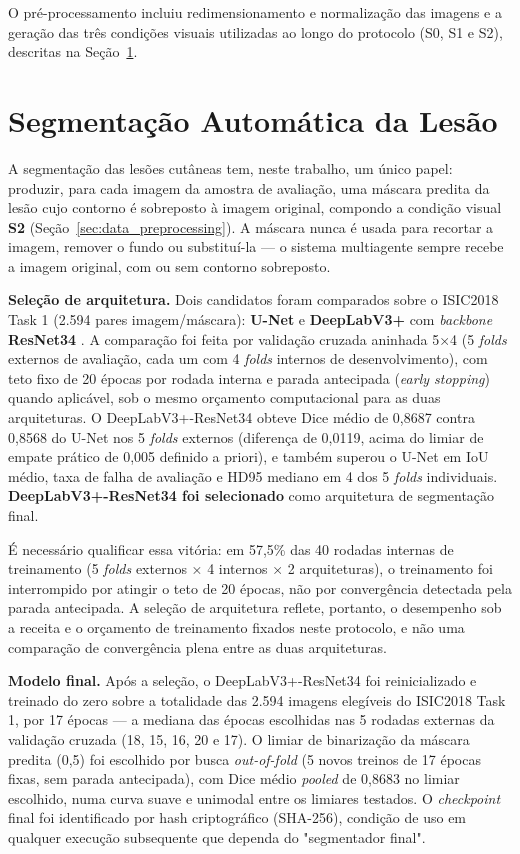 O pré-processamento incluiu redimensionamento e normalização das imagens e a geração das três condições visuais utilizadas ao longo do protocolo (S0, S1 e S2), descritas na Seção~\ref{sec:segmentacao}.


\section{Segmentação Automática da Lesão}
\label{sec:segmentacao}

A segmentação das lesões cutâneas tem, neste trabalho, um único papel: produzir, para cada imagem da amostra de avaliação, uma máscara predita da lesão cujo contorno é sobreposto à imagem original, compondo a condição visual \textbf{S2} (Seção~\ref{sec:data_preprocessing}). A máscara nunca é usada para recortar a imagem, remover o fundo ou substituí-la — o sistema multiagente sempre recebe a imagem original, com ou sem contorno sobreposto.

\textbf{Seleção de arquitetura.} Dois candidatos foram comparados sobre o ISIC2018 Task 1 \cite{codella2018isic} (2.594 pares imagem/máscara): \textbf{U-Net} \cite{ronneberger2015unet} e \textbf{DeepLabV3+} com \textit{backbone} \textbf{ResNet34} \cite{chen2018deeplabv3plus,he2016resnet}. A comparação foi feita por validação cruzada aninhada 5×4 (5 \textit{folds} externos de avaliação, cada um com 4 \textit{folds} internos de desenvolvimento), com teto fixo de 20 épocas por rodada interna e parada antecipada (\textit{early stopping}) quando aplicável, sob o mesmo orçamento computacional para as duas arquiteturas. O DeepLabV3+-ResNet34 obteve Dice médio de 0,8687 contra 0,8568 do U-Net nos 5 \textit{folds} externos (diferença de 0,0119, acima do limiar de empate prático de 0,005 definido a priori), e também superou o U-Net em IoU médio, taxa de falha de avaliação e HD95 mediano em 4 dos 5 \textit{folds} individuais. \textbf{DeepLabV3+-ResNet34 foi selecionado} como arquitetura de segmentação final.

É necessário qualificar essa vitória: em 57,5\% das 40 rodadas internas de treinamento (5 \textit{folds} externos × 4 internos × 2 arquiteturas), o treinamento foi interrompido por atingir o teto de 20 épocas, não por convergência detectada pela parada antecipada. A seleção de arquitetura reflete, portanto, o desempenho sob a receita e o orçamento de treinamento fixados neste protocolo, e não uma comparação de convergência plena entre as duas arquiteturas.

\textbf{Modelo final.} Após a seleção, o DeepLabV3+-ResNet34 foi reinicializado e treinado do zero sobre a totalidade das 2.594 imagens elegíveis do ISIC2018 Task 1, por 17 épocas — a mediana das épocas escolhidas nas 5 rodadas externas da validação cruzada (18, 15, 16, 20 e 17). O limiar de binarização da máscara predita (0,5) foi escolhido por busca \textit{out-of-fold} (5 novos treinos de 17 épocas fixas, sem parada antecipada), com Dice médio \textit{pooled} de 0,8683 no limiar escolhido, numa curva suave e unimodal entre os limiares testados. O \textit{checkpoint} final foi identificado por hash criptográfico (SHA-256), condição de uso em qualquer execução subsequente que dependa do "segmentador final".

